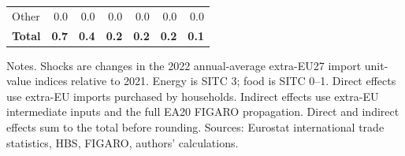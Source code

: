 \begin{table}[H]
\begin{tabularx}{\textwidth}{Xrrrrrr}
Other & 0.0 & 0.0 & 0.0 & 0.0 & 0.0 & 0.0\\
\textbf{Total} & \textbf{0.7} & \textbf{0.4} & \textbf{0.2} & \textbf{0.2} & \textbf{0.2} & \textbf{0.1}\\
\bottomrule
\end{tabularx}
\par\vspace{0.35em}\footnotesize\noindent Notes. Shocks are changes in the 2022 annual-average extra-EU27 import unit-value indices relative to 2021. Energy is SITC 3; food is SITC 0--1. Direct effects use extra-EU imports purchased by households. Indirect effects use extra-EU intermediate inputs and the full EA20 FIGARO propagation. Direct and indirect effects sum to the total before rounding. Sources: Eurostat international trade statistics, HBS, FIGARO, authors' calculations.
\end{table}
